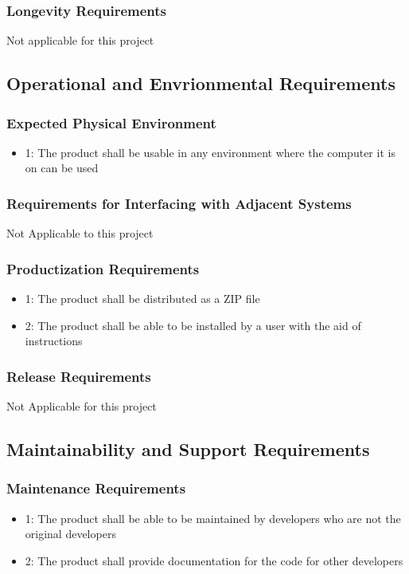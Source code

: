 \documentclass[12pt]{article}
\begin{document}
\subsubsection*{Longevity Requirements}
Not applicable for this project

\subsection{Operational and Envrionmental Requirements}

\subsubsection*{Expected Physical Environment}
\begin{itemize}
\item 1: The product shall be usable in any environment where the computer it is on can be used
\end{itemize}

\subsubsection*{Requirements for Interfacing with Adjacent Systems}
Not Applicable to this project

\subsubsection*{Productization Requirements}
\begin{itemize}
\item 1: The product shall be distributed as a ZIP file
\item 2: The product shall be able to be installed by a user with the aid of instructions
\end{itemize}

\subsubsection*{Release Requirements}
Not Applicable for this project

\subsection{Maintainability and Support Requirements}

\subsubsection*{Maintenance Requirements}
\begin{itemize}
\item 1: The product shall be able to be maintained by developers who are not the original developers
\item 2: The product shall provide documentation for the code for other developers
\end{itemize}
\end{document}
